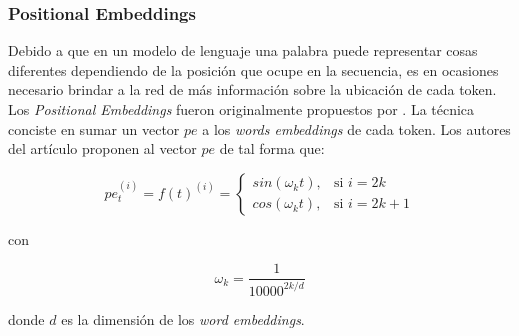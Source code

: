 	\subsubsection{Positional Embeddings}

	Debido a que en un modelo de lenguaje una palabra puede representar cosas diferentes dependiendo de la posición que ocupe en la secuencia, es en ocasiones necesario brindar a la red de más información sobre la ubicación de cada token. Los \textit{Positional Embeddings} fueron originalmente propuestos por \cite{attentionisallyouneed}. La técnica conciste en sumar un vector $pe$ a los \textit{words embeddings} de cada token. Los autores del artículo proponen al vector $pe$ de tal forma que: 

	\begin{equation}
		pe_{t}^{(i)} = f(t)^{(i)} = \left\{
			\begin{array}{ll}
				sin(\omega_{k}t), & \mbox{si } i = 2k \\
				cos(\omega_{k}t), & \mbox{si } i = 2k + 1
			\end{array}
		\right.
	\end{equation}

	con

	\begin{equation}
		\omega_{k} = \frac{1}{10000^{2k/d}}
	\end{equation}

	donde $d$ es la dimensión de los \textit{word embeddings}.

